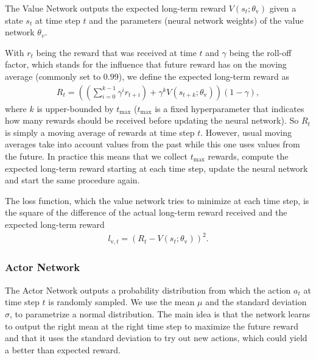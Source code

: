 \documentclass[sigconf]{acmart}
\newcommand\note[2]{{\color{#1}#2}}
\newcommand\todo[1]{{\note{red}{TODO: #1}}}
\begin{document}
The Value Network outputs the expected long-term reward $V(s_{t}; \theta_\text{v})$ given a state $s_t$ at time step $t$ and the parameters (neural network weights) of the value network $\theta_v$.

With $r_t$ being the reward that was received at time $t$ and $\gamma$ being the roll-off factor, which stands for the influence that future reward has on the moving average (commonly set to $0.99$), we define the expected long-term reward as 
\begin{align*}
R_t = \left(\left(\sum_{i=0}^{k-1} \gamma^ir_{t+i}\right) + \gamma^k V(s_{t+k}; \theta_\text{v})\right)\left( 1-\gamma \right),
\end{align*}
where $k$ is upper-bounded by $t_\text{max}$ ($t_\text{max}$ is a fixed hyperparameter that indicates how many rewards should be received before updating the neural network). So $R_t$ is simply a moving average of rewards at time step $t$. However, usual moving averages take into account values from the past while this one uses values from the future. In practice this means that we collect $t_\text{max}$ rewards, compute the expected long-term reward starting at each time step, update the neural network and start the same procedure again. 


The loss function, which the value network tries to minimize at each time step, is the square of the difference of the actual long-term reward received and the expected long-term reward
\begin{align*}
l_{\text{v},t} = \left(R_t - V(s_t; \theta_\text{v})\right)^2.
\end{align*}

\subsubsection{Actor Network}
\label{subsubsec:genericactor}

The Actor Network outputs a probability distribution from which the action $a_t$ at time step $t$ is randomly sampled. We use the mean $\mu$ and the standard deviation $\sigma$, to parametrize a normal distribution. The main idea is that the network learns to output the right mean at the right time step to maximize the future reward and that it uses the standard deviation to try out new actions, which could yield a better than expected reward. 
\end{document}
